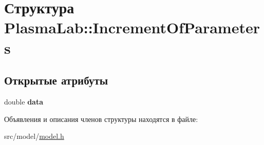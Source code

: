 \hypertarget{struct_plasma_lab_1_1_increment_of_parameters}{}\section{Структура Plasma\+Lab\+:\+:Increment\+Of\+Parameters}
\label{struct_plasma_lab_1_1_increment_of_parameters}
\subsection*{Открытые атрибуты}
\begin{DoxyCompactItemize}
\item 
\mbox{\label{struct_plasma_lab_1_1_increment_of_parameters_a63aba5c1e26ae14a9ca68dba070a7549}} 
double {\bfseries data}
\end{DoxyCompactItemize}


Объявления и описания членов структуры находятся в файле\+:\begin{DoxyCompactItemize}
\item 
src/model/\hyperlink{model_8h}{model.\+h}\end{DoxyCompactItemize}

